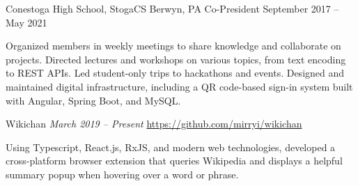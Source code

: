\documentclass[letterpaper,11pt]{article}
\begin{document}
\begin{rsectionlist}
    \rsectionitem
      {Conestoga High School, StogaCS}
      {Berwyn, PA}
      {Co-President}
      {September 2017 -- May 2021}

      Organized members in weekly meetings to share knowledge and collaborate on projects. Directed
      lectures and workshops on various topics, from text encoding to REST APIs. Led student-only
      trips to hackathons and events. Designed and maintained digital infrastructure, including a QR
      code-based sign-in system built with Angular, Spring Boot, and MySQL.
  \end{rsectionlist}

  \begin{rsectionlist}
    \rsectionitem
      {Wikichan}
      {\small\itshape March 2019 -- Present}
      {\small \url{https://github.com/mirryi/wikichan}}
      {}

      Using Typescript, React.js, RxJS, and modern web technologies, developed a cross-platform
      browser extension that queries Wikipedia and displays a helpful summary popup when hovering
      over a word or phrase.


  \end{rsectionlist}
\end{document}
